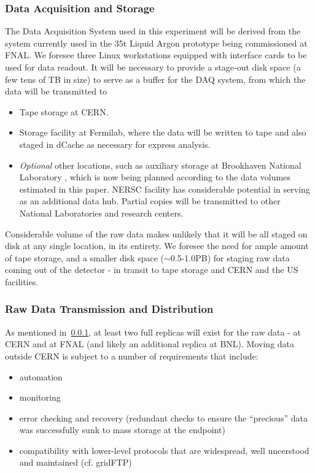 \subsubsection{Data Acquisition and Storage}
\label{daq_and_storage}
The Data Acquisition System used in this experiment will be derived from the system currently used in the 35t Liquid Argon prototype being commissioned at FNAL. We foresee three Linux workstations equipped with interface cards to be used for data readout. It will be necessary to provide a stage-out disk space (a few tens of TB in size) to serve as a buffer for the DAQ system, from which the data will be transmitted to
\begin{itemize}
\item Tape storage at CERN.
\item Storage facility at Fermilab, where the data will be written to tape and also staged in dCache as necessary for express analysis.
\item \textit{Optional} other locations, such as auxiliary storage at Brookhaven National Laboratory , which is now being planned according to the data volumes
estimated in this paper. NERSC facility has considerable potential in serving as an additional data hub. Partial copies will be transmitted to other National Laboratories
and research centers.
\end{itemize}

Considerable volume of the raw data makes unlikely that it will be all staged on disk at any single location, in its entirety. We foresee the
 need for ample amount of tape storage, and a smaller disk space ($\sim$0.5-1.0PB) for staging raw data coming out of the detector - in transit to tape
storage and CERN and the US facilities.

\subsubsection{Raw Data Transmission and Distribution}
As mentioned in~\ref{daq_and_storage}, at least two full replicas will exist for the raw data - at CERN and at FNAL (and likely an additional replica at BNL). Moving data outside CERN
is subject to a number of requirements that include:
\begin{itemize}
\item automation
\item monitoring
\item error checking and recovery (redundant checks to ensure the ``precious'' data was successfully sunk to mass storage at the endpoint)
\item compatibility with lower-level protocols that are widespread, well uncerstood and maintained (cf. gridFTP)
\end{itemize}

